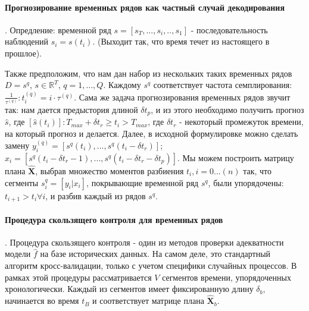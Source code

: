 \documentclass[12pt,twoside]{article}
\begin{document}
\paragraph{Прогнозирование временных рядов как частный случай декодирования}.
Опредление:  временной ряд $s = [s_T, ... , s_i, .. , s_1]$ - последовательность наблюдений $s_i = s(t_i)$. (Выходит так, что время течет из настоящего в прошлое).

Также предположим, что нам дан набор из нескольких таких временных рядов $D = {s^q}$, $s \in \mathbb{R}^T$, $q =1, ..., Q$.
Каждому $s^q$ соответствует частота семплирования:  $\displaystyle \frac{1}{\tau^{(q)}} : t_i^{(q)} = i \cdot  \tau^{(q)}$. Сама же задача прогнозирования временных рядов звучит так: нам дается предыстория длиной $\delta t_p$, и из этого необходимо получить прогноз $\hat{s}$, где $[\hat{s}(t_i)]: T_{max} + \delta t_r \geq  t_i > T_{max}$, где $\delta t_r$ - некоторый промежуток времени, на который прогноз и делается.   Далее, в исходной формулировке можно сделать замену $y_i^{(q)} = [s^q(t_i), ... , s^q(t_i - \delta t_r)]$;
$x_i = [s^q(t_i - \delta t_r - 1), ... , s^q(t_i - \delta t_r - \delta t_p)]$. Мы можем построить матрицу плана $\hat{\mathbf{X}}$, выбрав множество моментов разбиения ${t_i}, i = 0 ... (n) $ так, что сегменты $s_i^q = [y_i| x_i]$, покрывающие временной ряд $s^q$, были упорядочены: $t_{i + 1} > t_i \forall i$, и разбив каждый из рядов ${s^q}$.

\paragraph{Процедура скользящего контроля для временных рядов}.
Процедура скользящего контроля - один из методов проверки адекватности модели $\hat{f}$ на базе исторических данных. На самом деле, это стандартный алгоритм кросс-валидации, только с учетом специфики случайных процессов.
В рамках этой процедуры рассматривается $V$ сегментов времени, упорядоченных хронологически. Каждый из сегментов имеет фиксированную длину $\delta_b$, начинается во время $t_B$ и соответствует матрице плана $\hat{ \mathbf{X}}_b$.
\end{document}
